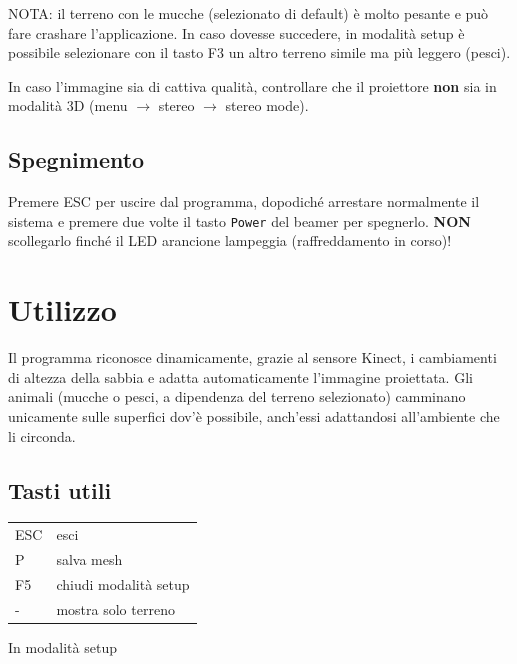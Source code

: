 \documentclass[12pt]{article}
\begin{document}
		NOTA: il terreno con le mucche (selezionato di default) è molto pesante e può fare crashare l'applicazione.
		In caso dovesse succedere, in modalità setup è possibile selezionare con il tasto F3 un altro terreno simile
		ma più leggero (pesci).
		
		In caso l'immagine sia di cattiva qualità, controllare
		che il proiettore \textbf{non} sia in modalità 3D (menu $\rightarrow$ stereo $\rightarrow$ stereo mode).\\


	\subsection{Spegnimento}
		
		Premere ESC per uscire dal programma, dopodiché arrestare normalmente il sistema e 
		premere due volte il tasto \texttt{Power} del beamer per spegnerlo. \textbf{NON} scollegarlo finché
		il LED arancione lampeggia (raffreddamento in corso)!
		
		
\section{Utilizzo}
		
	Il programma riconosce dinamicamente, grazie al sensore Kinect, i cambiamenti di altezza della sabbia
	e adatta automaticamente l'immagine proiettata. Gli animali (mucche o pesci, a dipendenza del terreno
	selezionato) camminano unicamente sulle superfici dov'è possibile, anch'essi adattandosi all'ambiente
	che li circonda.

	\subsection{Tasti utili}\label{sec:commands}
	
	\begin{tabular}{l l}
		ESC & esci\\
		P & salva mesh\\
		F5 & chiudi modalità setup\\
		- & mostra solo terreno\\
	\end{tabular}

	In modalità setup
\end{document}
